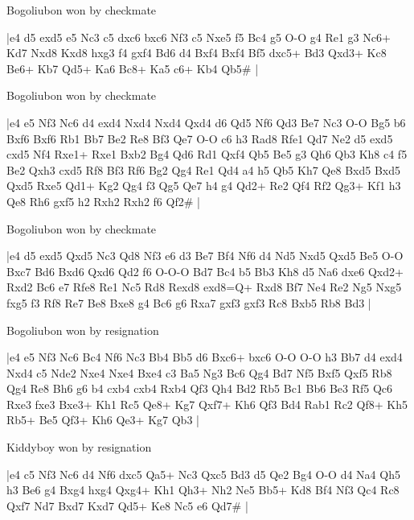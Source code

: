 \showboard

Bogoliubon won by checkmate

\makegametitle
|e4 d5 exd5 e5 Nc3 c5 dxc6 bxc6 Nf3 c5 Nxe5 f5 Bc4 g5 O-O g4 Re1 g3 Nc6+ Kd7 Nxd8 Kxd8 hxg3 f4 gxf4 Bd6 d4 Bxf4 Bxf4 Bf5 dxc5+ Bd3 Qxd3+ Kc8 Be6+ Kb7 Qd5+ Ka6 Bc8+ Ka5 c6+ Kb4 Qb5\#  |

\showboard

Bogoliubon won by checkmate

\makegametitle
|e4 e5 Nf3 Nc6 d4 exd4 Nxd4 Nxd4 Qxd4 d6 Qd5 Nf6 Qd3 Be7 Nc3 O-O Bg5 b6 Bxf6 Bxf6 Rb1 Bb7 Be2 Re8 Bf3 Qe7 O-O c6 h3 Rad8 Rfe1 Qd7 Ne2 d5 exd5 cxd5 Nf4 Rxe1+ Rxe1 Bxb2 Bg4 Qd6 Rd1 Qxf4 Qb5 Be5 g3 Qh6 Qb3 Kh8 c4 f5 Be2 Qxh3 cxd5 Rf8 Bf3 Rf6 Bg2 Qg4 Re1 Qd4 a4 h5 Qb5 Kh7 Qe8 Bxd5 Bxd5 Qxd5 Rxe5 Qd1+ Kg2 Qg4 f3 Qg5 Qe7 h4 g4 Qd2+ Re2 Qf4 Rf2 Qg3+ Kf1 h3 Qe8 Rh6 gxf5 h2 Rxh2 Rxh2 f6 Qf2\#  |

\showboard

Bogoliubon won by checkmate

\makegametitle
|e4 d5 exd5 Qxd5 Nc3 Qd8 Nf3 e6 d3 Be7 Bf4 Nf6 d4 Nd5 Nxd5 Qxd5 Be5 O-O Bxc7 Bd6 Bxd6 Qxd6 Qd2 f6 O-O-O Bd7 Bc4 b5 Bb3 Kh8 d5 Na6 dxe6 Qxd2+ Rxd2 Bc6 e7 Rfe8 Re1 Nc5 Rd8 Rexd8 exd8=Q+ Rxd8 Bf7 Ne4 Re2 Ng5 Nxg5 fxg5 f3 Rf8 Re7 Be8 Bxe8 g4 Bc6 g6 Rxa7 gxf3 gxf3 Rc8 Bxb5 Rb8 Bd3  |

\showboard

Bogoliubon won by resignation

\makegametitle
|e4 e5 Nf3 Nc6 Bc4 Nf6 Nc3 Bb4 Bb5 d6 Bxc6+ bxc6 O-O O-O h3 Bb7 d4 exd4 Nxd4 c5 Nde2 Nxe4 Nxe4 Bxe4 c3 Ba5 Ng3 Bc6 Qg4 Bd7 Nf5 Bxf5 Qxf5 Rb8 Qg4 Re8 Bh6 g6 b4 cxb4 cxb4 Rxb4 Qf3 Qh4 Bd2 Rb5 Bc1 Bb6 Be3 Rf5 Qc6 Rxe3 fxe3 Bxe3+ Kh1 Rc5 Qe8+ Kg7 Qxf7+ Kh6 Qf3 Bd4 Rab1 Rc2 Qf8+ Kh5 Rb5+ Be5 Qf3+ Kh6 Qe3+ Kg7 Qb3  |

\showboard

Kiddyboy won by resignation

\makegametitle
|e4 c5 Nf3 Nc6 d4 Nf6 dxc5 Qa5+ Nc3 Qxc5 Bd3 d5 Qe2 Bg4 O-O d4 Na4 Qh5 h3 Be6 g4 Bxg4 hxg4 Qxg4+ Kh1 Qh3+ Nh2 Ne5 Bb5+ Kd8 Bf4 Nf3 Qc4 Rc8 Qxf7 Nd7 Bxd7 Kxd7 Qd5+ Ke8 Nc5 e6 Qd7\#  |

